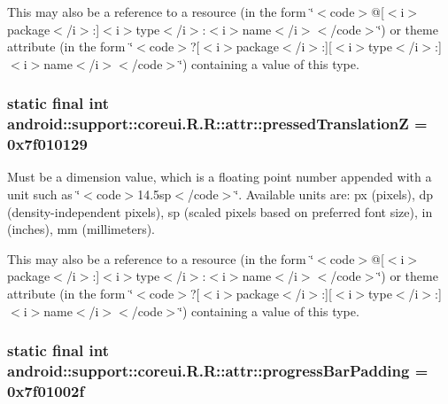 This may also be a reference to a resource (in the form \char`\"{}$<$code$>$@\mbox{[}$<$i$>$package$<$/i$>$:\mbox{]}$<$i$>$type$<$/i$>$:$<$i$>$name$<$/i$>$$<$/code$>$\char`\"{}) or theme attribute (in the form \char`\"{}$<$code$>$?\mbox{[}$<$i$>$package$<$/i$>$:\mbox{]}\mbox{[}$<$i$>$type$<$/i$>$:\mbox{]}$<$i$>$name$<$/i$>$$<$/code$>$\char`\"{}) containing a value of this type. \hypertarget{classandroid_1_1support_1_1coreui_1_1_r_1_1attr_ab557666c310b09bc22b55414a322a08}{
\subsubsection[{pressedTranslationZ}]{\setlength{\rightskip}{0pt plus 5cm}static final int android::support::coreui.R.R::attr::pressedTranslationZ = 0x7f010129}}
\label{classandroid_1_1support_1_1coreui_1_1_r_1_1attr_ab557666c310b09bc22b55414a322a08}


Must be a dimension value, which is a floating point number appended with a unit such as \char`\"{}$<$code$>$14.5sp$<$/code$>$\char`\"{}. Available units are: px (pixels), dp (density-independent pixels), sp (scaled pixels based on preferred font size), in (inches), mm (millimeters). 

This may also be a reference to a resource (in the form \char`\"{}$<$code$>$@\mbox{[}$<$i$>$package$<$/i$>$:\mbox{]}$<$i$>$type$<$/i$>$:$<$i$>$name$<$/i$>$$<$/code$>$\char`\"{}) or theme attribute (in the form \char`\"{}$<$code$>$?\mbox{[}$<$i$>$package$<$/i$>$:\mbox{]}\mbox{[}$<$i$>$type$<$/i$>$:\mbox{]}$<$i$>$name$<$/i$>$$<$/code$>$\char`\"{}) containing a value of this type. \hypertarget{classandroid_1_1support_1_1coreui_1_1_r_1_1attr_76d377581674cf4096a2cd42068387a4}{
\subsubsection[{progressBarPadding}]{\setlength{\rightskip}{0pt plus 5cm}static final int android::support::coreui.R.R::attr::progressBarPadding = 0x7f01002f}}
\label{classandroid_1_1support_1_1coreui_1_1_r_1_1attr_76d377581674cf4096a2cd42068387a4}


